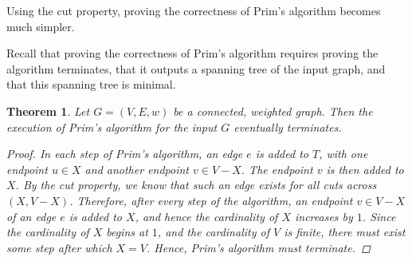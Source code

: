 \documentclass[a4paper,11pt]{report}
\theoremstyle{plain}
\newtheorem{thm}{Theorem}[section]
\theoremstyle{definition}
\begin{document}
Using the cut property, proving the correctness of Prim's algorithm becomes
much simpler.

Recall that proving the correctness of Prim's algorithm requires proving the
algorithm terminates, that it outputs a spanning tree of the input graph, and
that this spanning tree is minimal.

\begin{thm}
Let $G = (V, E, w)$ be a connected, weighted graph. Then the
execution of Prim's algorithm for the input $G$ eventually terminates.

\begin{proof}
In each step of Prim's algorithm, an edge $e$ is added to $T$, with one
endpoint $u \in X$ and another endpoint $v \in V - X$. The endpoint $v$ is then
added to $X$. By the cut property, we know that such an edge exists for all
cuts across $(X, V - X)$. Therefore, after every step of the algorithm, an
endpoint $v \in V - X$ of an edge $e$ is added to $X$, and hence the
cardinality of $X$ increases by $1$. Since the cardinality of $X$ begins at
$1$, and the cardinality of $V$ is finite, there must exist some step after
which $X = V$. Hence, Prim's algorithm must terminate.
\end{proof}
\end{thm}
\end{document}
